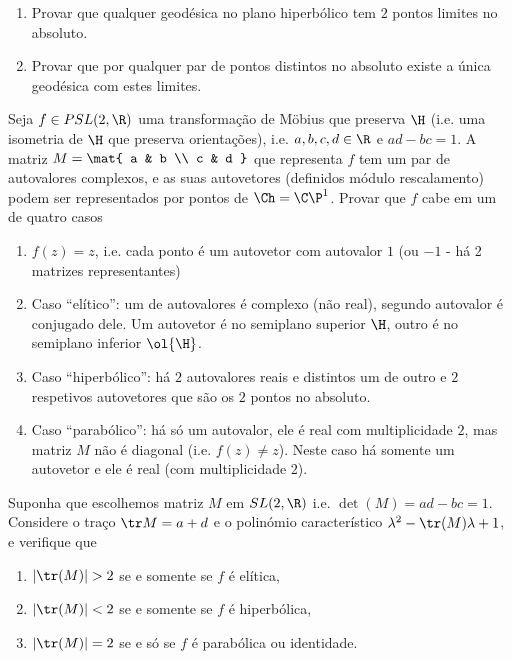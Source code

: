 \begin{problema}
\begin{enumerate}
\item Provar que qualquer geodésica no plano hiperbólico tem $2$ pontos limites no absoluto.
\item Provar que por qualquer par de pontos distintos no absoluto existe a única geodésica
com estes limites.
\end{enumerate}
\end{problema}

\begin{problema}
Seja $f \in PSL(2,\R)$ uma transformação de Möbius que preserva $\H$ (i.e. uma isometria de $\H$
que preserva orientações), i.e. $a,b,c,d\in\R$ e $ad-bc=1$.
A matriz $M = \mat{ a & b \\ c & d }$ que representa $f$ tem um par de autovalores complexos,
e as suas autovetores (definidos módulo rescalamento) podem ser representados por pontos de $\Ch = \C\P^1$.
Provar que $f$ cabe em um de quatro casos
\begin{enumerate}
\item $f(z) = z$, i.e. cada ponto é um autovetor com autovalor $1$ (ou $-1$ - há 2 matrizes representantes)
\item Caso ``elítico'': um de autovalores é complexo (não real), segundo autovalor é conjugado dele.
Um autovetor é no semiplano superior $\H$, outro é no semiplano inferior $\ol{\H}$.
\item Caso ``hiperbólico'': há $2$ autovalores reais e distintos um de outro e $2$ respetivos autovetores
que são os $2$ pontos no absoluto.
\item Caso ``parabólico'': há só um autovalor, ele é real com multiplicidade $2$, mas matriz $M$ não é diagonal
(i.e. $f(z) \neq z$). Neste caso há somente um autovetor e ele é real (com multiplicidade $2$).
\end{enumerate}
Suponha que escolhemos matriz $M$ em $SL(2,\R)$ i.e. $\det(M) = ad-bc = 1$.
Considere o traço $\tr M = a+d$ e o polinómio característico $\lambda^2 - \tr(M) \lambda + 1$,
e verifique que
\begin{enumerate}
\item $|\tr(M)|>2$ se e somente se $f$ é elítica,
\item $|\tr(M)|<2$ se e somente se $f$ é hiperbólica,
\item $|\tr(M)|=2$ se e só se $f$ é parabólica ou identidade.
\end{enumerate}
\end{problema}


